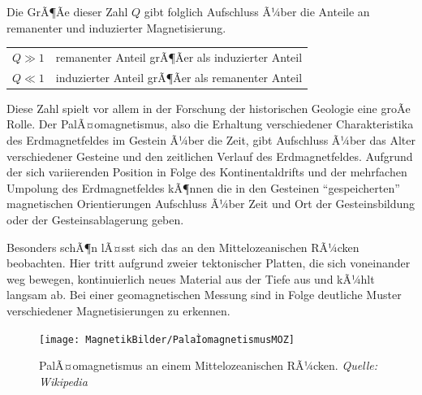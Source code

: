 Die GrÃ¶Ãe dieser Zahl $Q$ gibt folglich Aufschluss Ã¼ber die Anteile an remanenter und induzierter Magnetisierung. 

\begin{tabular}{ll}
	$Q \gg 1$ & remanenter Anteil grÃ¶Ãer als induzierter Anteil  \\
	$Q \ll 1$ & induzierter Anteil grÃ¶Ãer als remanenter Anteil
\end{tabular}

Diese Zahl spielt vor allem in der Forschung der historischen Geologie eine groÃe Rolle. Der PalÃ¤omagnetismus, also die Erhaltung verschiedener Charakteristika des Erdmagnetfeldes im Gestein Ã¼ber die Zeit, gibt Aufschluss Ã¼ber das Alter verschiedener Gesteine und den zeitlichen Verlauf des Erdmagnetfeldes. 
	Aufgrund der sich variierenden Position in Folge des
	Kontinentaldrifts und der mehrfachen Umpolung des
	Erdmagnetfeldes kÃ¶nnen die in den Gesteinen
	"`gespeicherten"' magnetischen Orientierungen Aufschluss
	Ã¼ber Zeit und Ort der Gesteinsbildung oder der
	Gesteinsablagerung geben.
	
Besonders schÃ¶n lÃ¤sst sich das an den Mittelozeanischen RÃ¼cken beobachten. Hier tritt aufgrund zweier tektonischer Platten, die sich voneinander weg bewegen, kontinuierlich neues Material aus der Tiefe aus und kÃ¼hlt langsam ab. Bei einer geomagnetischen Messung sind in Folge deutliche Muster verschiedener Magnetisierungen zu erkennen. 

\begin{figure}[H]
	\texttt{[image: MagnetikBilder/PalaÌomagnetismusMOZ]}
    \caption*{PalÃ¤omagnetismus an einem Mittelozeanischen RÃ¼cken.  \textit{Quelle: Wikipedia}}
\end{figure}











